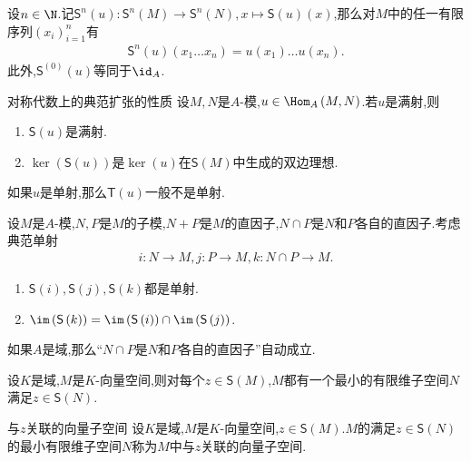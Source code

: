 \begin{remark}{}{}
	设$n\in\N$.记$\mathsf{S}^{n}\left(u\right):\mathsf{S}^{n}\left(M\right)\to\mathsf{S}^{n}\left(N\right),x\mapsto\mathsf{S}\left(u\right)\left(x\right)$,那么对$M$中的任一有限序列$\left(x_{i}\right)_{i=1}^{n}$有
	\begin{align*}
		\mathsf{S}^{n}\left(u\right)\left(x_{1}\ldots x_{n}\right)=u\left(x_{1}\right)\ldots u\left(x_{n}\right).
	\end{align*}
	此外,$\mathsf{S}^{\left(0\right)}\left(u\right)$等同于$\id_{A}$.
\end{remark}

\begin{proposition}{对称代数上的典范扩张的性质}{}
	设$M,N$是$A$-模,$u\in\Hom_{A}\left(M,N\right)$.若$u$是满射,则
	\begin{enumerate}
		\item $\mathsf{S}\left(u\right)$是满射.
		\item $\ker\left(\mathsf{S}\left(u\right)\right)$是$\ker\left(u\right)$在$\mathsf{S}\left(M\right)$中生成的双边理想.
	\end{enumerate}
\end{proposition}

\begin{remark}{}{}
	如果$u$是单射,那么$\mathsf{T}\left(u\right)$一般不是单射.
\end{remark}

\begin{proposition}{}{}
	设$M$是$A$-模,$N,P$是$M$的子模,$N+P$是$M$的直因子,$N\cap P$是$N$和$P$各自的直因子.考虑典范单射
	\begin{align*}
		i:N\to M,j:P\to M,k:N\cap P\to M.
	\end{align*}
	\begin{enumerate}
		\item $\mathsf{S}\left(i\right),\mathsf{S}\left(j\right),\mathsf{S}\left(k\right)$都是单射.
		\item $\im\left(\mathsf{S}\left(k\right)\right)=\im\left(\mathsf{S}\left(i\right)\right)\cap\im\left(\mathsf{S}\left(j\right)\right)$.
	\end{enumerate}
\end{proposition}

\begin{remark}{}{}
	如果$A$是域,那么``$N\cap P$是$N$和$P$各自的直因子''自动成立.
\end{remark}

\begin{corollary}{}{}
	设$K$是域,$M$是$K$-向量空间,则对每个$z\in\mathsf{S}\left(M\right)$,$M$都有一个最小的有限维子空间$N$满足$z\in\mathsf{S}\left(N\right)$.
\end{corollary}

\begin{definition}{与$z$关联的向量子空间}{}
	设$K$是域,$M$是$K$-向量空间,$z\in\mathsf{S}\left(M\right)$.$M$的满足$z\in\mathsf{S}\left(N\right)$的最小有限维子空间$N$称为$M$中与$z$关联的向量子空间.
\end{definition}




